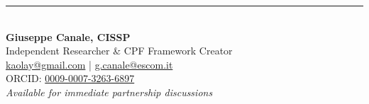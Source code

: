 \documentclass[11pt,a4paper]{article}
\begin{document}
\vspace{1.5cm}

\begin{center}
\rule{10cm}{0.5pt}\\[0.5cm]
\textbf{Giuseppe Canale, CISSP}\\
Independent Researcher \& CPF Framework Creator\\
\href{mailto:kaolay@gmail.com}{kaolay@gmail.com} | \href{mailto:g.canale@escom.it}{g.canale@escom.it}\\
ORCID: \href{https://orcid.org/0009-0007-3263-6897}{0009-0007-3263-6897}\\[0.3cm]
\textcolor{mediumgray}{\textit{Available for immediate partnership discussions}}
\end{center}
\end{document}
